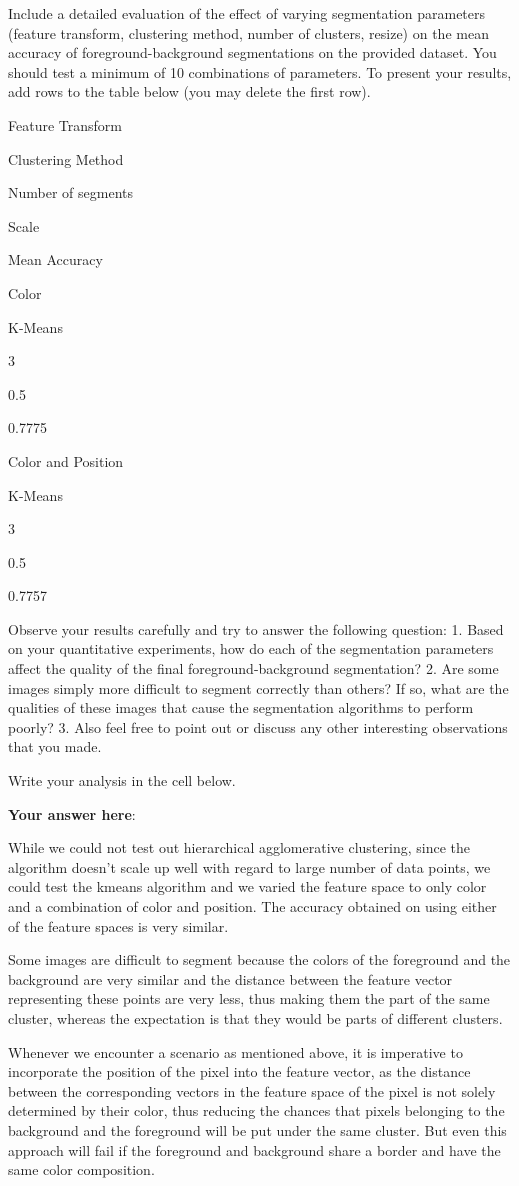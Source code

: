 \documentclass[11pt]{article}
\begin{document}
    Include a detailed evaluation of the effect of varying segmentation
parameters (feature transform, clustering method, number of clusters,
resize) on the mean accuracy of foreground-background segmentations on
the provided dataset. You should test a minimum of 10 combinations of
parameters. To present your results, add rows to the table below (you
may delete the first row).

    Feature Transform

Clustering Method

Number of segments

Scale

Mean Accuracy

Color

K-Means

3

0.5

0.7775

Color and Position

K-Means

3

0.5

0.7757

    Observe your results carefully and try to answer the following question:
1. Based on your quantitative experiments, how do each of the
segmentation parameters affect the quality of the final
foreground-background segmentation? 2. Are some images simply more
difficult to segment correctly than others? If so, what are the
qualities of these images that cause the segmentation algorithms to
perform poorly? 3. Also feel free to point out or discuss any other
interesting observations that you made.

Write your analysis in the cell below.

    \textbf{Your answer here}:

While we could not test out hierarchical agglomerative clustering, since
the algorithm doesn't scale up well with regard to large number of data
points, we could test the kmeans algorithm and we varied the feature
space to only color and a combination of color and position. The
accuracy obtained on using either of the feature spaces is very similar.

Some images are difficult to segment because the colors of the
foreground and the background are very similar and the distance between
the feature vector representing these points are very less, thus making
them the part of the same cluster, whereas the expectation is that they
would be parts of different clusters.

Whenever we encounter a scenario as mentioned above, it is imperative to
incorporate the position of the pixel into the feature vector, as the
distance between the corresponding vectors in the feature space of the
pixel is not solely determined by their color, thus reducing the chances
that pixels belonging to the background and the foreground will be put
under the same cluster. But even this approach will fail if the
foreground and background share a border and have the same color
composition.


    
    
    
\end{document}
